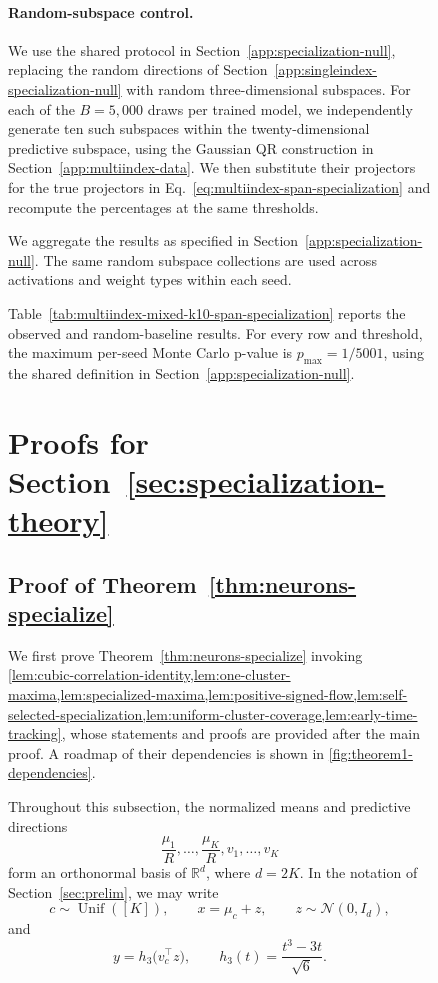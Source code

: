 \documentclass{article}
\newcounter{model}[section]
\begin{document}
\begin{figure}
\paragraph{Random-subspace control.}
We use the shared protocol in Section~\ref{app:specialization-null},
replacing the random directions of
Section~\ref{app:singleindex-specialization-null} with random
three-dimensional subspaces. For each of the \(B=5{,}000\) draws per
trained model, we independently generate ten such subspaces within the
twenty-dimensional predictive subspace, using the Gaussian QR construction
in Section~\ref{app:multiindex-data}. We then substitute their projectors
for the true projectors in Eq.~\ref{eq:multiindex-span-specialization} and
recompute the percentages at the same thresholds.

We aggregate the results as specified in
Section~\ref{app:specialization-null}. The same random subspace collections are used across activations
and weight types within each seed.

Table~\ref{tab:multiindex-mixed-k10-span-specialization} reports the
observed and random-baseline results. For every row and threshold, the
maximum per-seed Monte Carlo p-value is \(p_{\max}=1/5001\), using the shared definition in
Section~\ref{app:specialization-null}.

\newpage
\section{Proofs for Section~\ref{sec:specialization-theory}}
\label{app:specialization-theory-proofs}

\subsection{Proof of Theorem~\ref{thm:neurons-specialize}}
\label{app:proof-neurons-specialize}

We first prove Theorem~\ref{thm:neurons-specialize} invoking
\cref{lem:cubic-correlation-identity,lem:one-cluster-maxima,lem:specialized-maxima,lem:positive-signed-flow,lem:self-selected-specialization,lem:uniform-cluster-coverage,lem:early-time-tracking},
whose statements and proofs are provided after the main proof.
A roadmap of their dependencies is shown in
\cref{fig:theorem1-dependencies}.

{
Throughout this subsection, the normalized means and predictive directions
\[
    \frac{\mu_1}{R},\ldots,\frac{\mu_K}{R},
    v_1,\ldots,v_K
\]
form an orthonormal basis of $\mathbb R^d$, where $d=2K$. In the notation of
Section~\ref{sec:prelim}, we may write
\[
    c\sim\operatorname{Unif}([K]),
    \qquad
    x=\mu_c+z,
    \qquad
    z\sim\mathcal N(0,I_d),
\]
and
\[
    y=h_3\bigl(v_c^\top z\bigr),
    \qquad
    h_3(t)=\frac{t^3-3t}{\sqrt6}.
\]

}
\end{figure}
\end{document}
